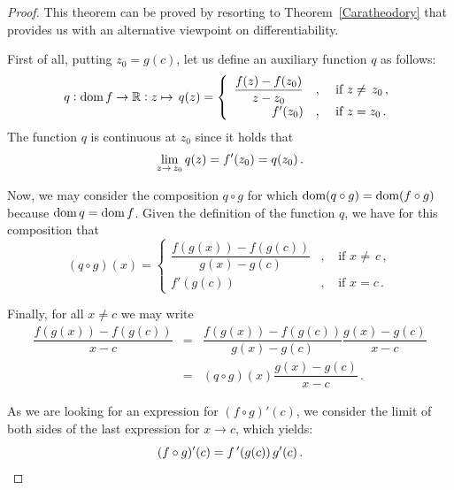 \begin{proof}
This theorem can be proved by resorting to Theorem~\ref{Caratheodory} that provides us with an alternative viewpoint on differentiability.

First of all, putting $z_0=g(c)$, let us define an auxiliary function $q$ as follows:
$$
q:\text{dom}{\,}f\to\mathbb{R}:z\mapsto\,q(z)=\left\{\begin{array}{rcl}
\dfrac{f(z)-f(z_0)}{z-z_0}&,&\text{ if }z\neq\,z_0\,,\\[0.2cm]
f'(z_0)&,&\text{ if }z=z_0\,.
\end{array}
\right.
$$ The function $q$ is continuous at $z_0$ since it holds that
$$
\displaystyle\lim_{z\to\,z_0}q(z)=f'(z_0)=q(z_0)\,.
$$

Now, we may consider the composition $q\circ g$ for which $\text{dom}{(}q\circ g)=\text{dom}{(}f\circ g)$ because $\text{dom}{\,}q=\text{dom}{\,}f$. Given the definition of the function $q$, we have for this composition that 
$$
(q\circ g)(x)
=\left\{\begin{array}{rcl}
\dfrac{f(g(x))-f(g(c))}{g(x)-g(c)}&,&\text{ if }x\neq\,c\,,\\[0.2cm]
f'\left(g(c)\right)&,&\text{ if }x=c\,.
\end{array}\right.
$$

Finally, for all $x\neq c$ we may write
\begin{eqnarray*}
\dfrac{f(g(x))-f(g(c))}{x-c}&=&\dfrac{f(g(x))-f(g(c))}{g(x)-g(c)}\dfrac{g(x)-g(c)}{x-c}\\
&=&(q\circ g)(x)\dfrac{g(x)-g(c)}{x-c}\,.
\end{eqnarray*}

As we are looking for an expression for $(f\circ g)'(c)$, we consider the limit of both sides of the last expression for $x\to c$, which yields:
$$
(f\circ g)'(c)=f\,'(g(c))\, g'(c)\,.
$$
\end{proof}
%

